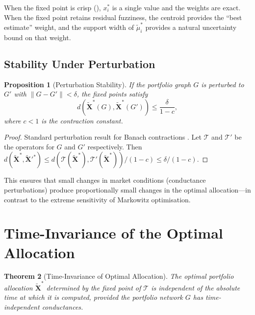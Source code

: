 \documentclass[twocolumn,10pt]{article}
\newtheorem{theorem}{Theorem}[section]
\newtheorem{proposition}[theorem]{Proposition}
\theoremstyle{remark}
\newcommand{\fuzzy}[1]{\tilde{#1}}
\newcommand{\fuzzyset}[1]{\tilde{\mu}_{#1}}
\newcommand{\Tcomp}{\mathcal{T}}
\begin{document}
When the fixed point is crisp (), $x_i^*$ is a single value and the weights are exact.  When the fixed point retains residual fuzziness, the centroid provides the ``best estimate'' weight, and the support width of $\fuzzyset{i}^*$ provides a natural uncertainty bound on that weight.

\subsection{Stability Under Perturbation}

\begin{proposition}[Perturbation Stability]
\label{prop:stability}
If the portfolio graph $G$ is perturbed to $G'$ with $\|G - G'\| < \delta$, the fixed points satisfy
\begin{equation}
    d(\fuzzy{\mathbf{X}}^*(G), \fuzzy{\mathbf{X}}^*(G')) \leq \frac{\delta}{1 - c},
    \label{eq:stability}
\end{equation}
where $c < 1$ is the contraction constant.
\end{proposition}

\begin{proof}
Standard perturbation result for Banach contractions \cite{kreyszig1978}.  Let $\Tcomp$ and $\Tcomp'$ be the operators for $G$ and $G'$ respectively.  Then $d(\fuzzy{\mathbf{X}}^*, \fuzzy{\mathbf{X}}'^*) \leq d(\Tcomp(\fuzzy{\mathbf{X}}^*), \Tcomp'(\fuzzy{\mathbf{X}}^*)) / (1 - c) \leq \delta / (1-c)$.
\end{proof}

This ensures that small changes in market conditions (conductance perturbations) produce proportionally small changes in the optimal allocation---in contrast to the extreme sensitivity of Markowitz optimisation.


\section{Time-Invariance of the Optimal Allocation}
\label{sec:time_invariance}

\begin{theorem}[Time-Invariance of Optimal Allocation]
\label{thm:time_inv_alloc}
The optimal portfolio allocation $\fuzzy{\mathbf{X}}^*$ determined by the fixed point of $\Tcomp$ is independent of the absolute time at which it is computed, provided the portfolio network $G$ has time-independent conductances.
\end{theorem}
\end{document}
